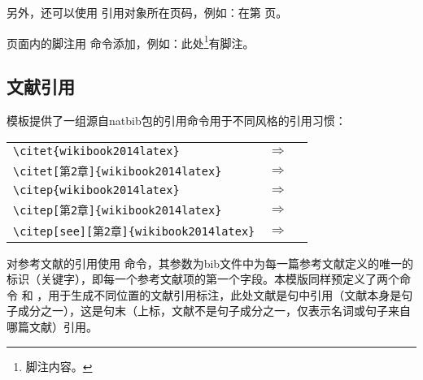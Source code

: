 另外，还可以使用 引用对象所在页码，例如：在第 \pageref{fig:samples:blcfy} 页。

页面内的脚注用 命令添加，例如：此处\footnote{脚注内容。}有脚注。

\subsection{文献引用}\label{sec:samples:cite}
模板提供了一组源自natbib包的引用命令用于不同风格的引用习惯：
\begin{center}
\renewcommand{\arraystretch}{1.0}
\begin{tabular}{lcl}
\verb|\citet{wikibook2014latex}| & $\Rightarrow$ & \citet{wikibook2014latex} \\
\verb|\citet[第2章]{wikibook2014latex}| & $\Rightarrow$ & \citet[第2章]{wikibook2014latex} \\
\verb|\citep{wikibook2014latex}| & $\Rightarrow$ & \citep{wikibook2014latex} \\
\verb|\citep[第2章]{wikibook2014latex}| & $\Rightarrow$ & \citep[第2章]{wikibook2014latex} \\
\verb|\citep[see][第2章]{wikibook2014latex}| & $\Rightarrow$ & \citep[见][第2章]{wikibook2014latex}
\end{tabular}
\end{center}

对参考文献的引用使用  命令，其参数为bib文件中为每一篇参考文献定义的唯一的标识（关键字），即每一个参考文献项的第一个字段。本模版同样预定义了两个命令  和 ，用于生成不同位置的文献引用标注，此处文献是句中引用（文献本身是句子成分之一），这是句末（上标，文献不是句子成分之一，仅表示名词或句子来自哪篇文献）引用。

